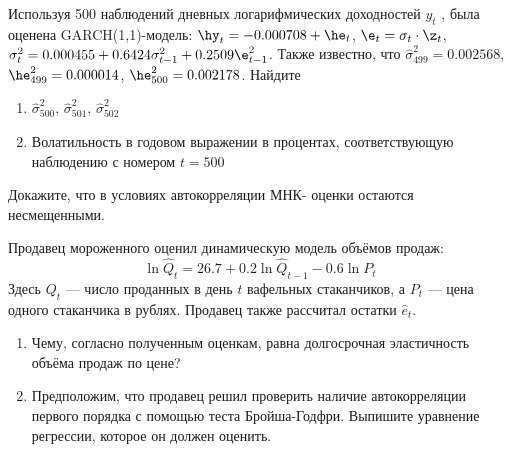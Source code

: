 \begin{solution}
\end{solution}


\begin{problem}
Используя 500 наблюдений дневных логарифмических доходностей $y_t$ ,
была оценена GARCH(1,1)-модель: $\hy_t=-0.000708+\he_t$, $\e_t=\sigma_t \cdot \z_t$, $\sigma^2_t=0.000455+0.6424\sigma^2_{t-1}+0.2509\e^2_{t-1}$. Также известно, что $\hat{\sigma}^2_{499}=0.002568$, $\he^2_{499}=0.000014$, $\he^2_{500}=0.002178$.
Найдите 
\begin{enumerate}
\item  $\hat{\sigma}^2_{500}$, $\hat{\sigma}^2_{501}$, $\hat{\sigma}^2_{502}$
\item Волатильность в годовом выражении в процентах, соответствующую
наблюдению с номером $t = 500$
\end{enumerate}
\end{problem}

\begin{solution}
\end{solution}


\begin{problem}
Докажите, что в условиях автокорреляции МНК-
оценки остаются несмещенными.
\end{problem}

\begin{solution}
\end{solution}


\begin{problem}
Продавец мороженного оценил динамическую модель объёмов продаж:
\[
\ln \hat{Q}_t=26.7 + 0.2\ln \hat{Q}_{t-1}-0.6\ln P_t
\]
Здесь $Q_t$ --- число проданных в день $t$ вафельных стаканчиков, а $P_t$ --- цена одного стаканчика в рублях. Продавец также рассчитал остатки $\hat{e}_t$.
\begin{enumerate}
\item Чему, согласно полученным оценкам, равна долгосрочная эластичность объёма продаж по цене?
\item Предположим, что продавец решил проверить наличие автокорреляции первого порядка с помощью теста Бройша-Годфри. Выпишите уравнение регрессии, которое он должен оценить.  
\end{enumerate}
\end{problem}

\begin{solution}
\end{solution}

